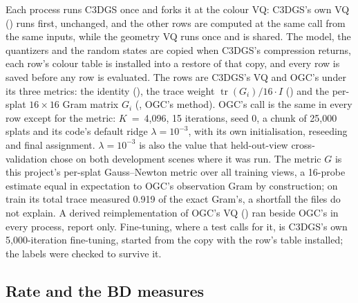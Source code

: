 Each process runs C3DGS once and forks it at the colour VQ: C3DGS's own VQ () runs first, unchanged, and the other rows are computed at the same call from the same inputs, while the geometry VQ runs once and is shared. %
The model, the quantizers and the random states are copied when C3DGS's compression returns, each row's colour table is installed into a restore of that copy, and every row is saved before any row is evaluated. %
The rows are C3DGS's VQ and OGC's  under its three metrics: the identity (), the trace weight $\operatorname{tr}(G_i)/16\cdot I$ () and the per-splat $16\times16$ Gram matrix $G_i$ (, OGC's method). %
OGC's call is the same in every row except for the metric: $K$~=~4,096, 15 iterations, seed 0, a chunk of 25,000 splats and its code's default ridge $\lambda = 10^{-3}$, with its own initialisation, reseeding and final assignment. %
$\lambda = 10^{-3}$ is also the value that held-out-view cross-validation chose on both development scenes where it was run. %
The metric $G$ is this project's per-splat Gauss--Newton metric over all training views, a 16-probe estimate equal in expectation to OGC's observation Gram by construction; on train its total trace measured 0.919 of the exact Gram's, a shortfall the files do not explain. %
A derived reimplementation of OGC's VQ () ran beside OGC's in every process, report only. %
Fine-tuning, where a test calls for it, is C3DGS's own 5,000-iteration fine-tuning, started from the copy with the row's table installed; the labels were checked to survive it. %

\subsection{Rate and the BD measures}


